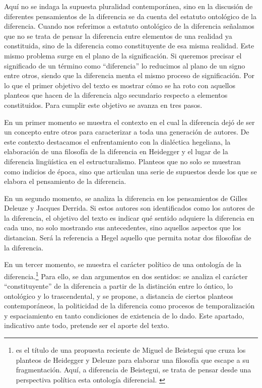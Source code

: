 Aquí no se indaga la supuesta pluralidad contemporánea, sino en la discusión de diferentes pensamientos de la diferencia se da cuenta del estatuto ontológico de la diferencia. Cuando nos referimos a estatuto ontológico de la diferencia señalamos que no se trata de pensar la diferencia entre elementos de una realidad ya constituida, sino de la diferencia como constituyente de esa misma realidad. Este mismo problema surge en el plano de la significación. Si queremos precisar el significado de un término como \enquote{diferencia} lo reducimos al plano de un signo entre otros, siendo que la diferencia menta el mismo proceso de significación. Por lo que el primer objetivo del texto es mostrar cómo se ha roto con aquellos planteos que hacen de la diferencia algo secundario respecto a elementos constituidos. Para cumplir este objetivo se avanza en tres pasos.

En un primer momento se muestra el contexto en el cual la diferencia dejó de ser un concepto entre otros para caracterizar a toda una generación de autores. De este contexto destacamos el enfrentamiento con la dialéctica hegeliana, la elaboración de una filosofía de la diferencia en Heidegger y el lugar de la diferencia lingüística en el estructuralismo. Planteos que no solo se muestran como indicios de época, sino que articulan una serie de supuestos desde los que se elabora el pensamiento de la diferencia.

En un segundo momento, se analiza la diferencia en los pensamientos de Gilles Deleuze y Jacques Derrida. Si estos autores son identificados como los autores de la diferencia, el objetivo del texto es indicar qué sentido adquiere la diferencia en cada uno, no solo mostrando sus antecedentes, sino aquellos aspectos que los distancian. Será la referencia a Hegel aquello que permita notar dos filosofías de la diferencia.

En un tercer momento, se muestra el carácter político de una ontología de la diferencia.\footnote{\emph{\autocite{@6960-BEISTEGUI2004}} es el título de una propuesta reciente de Miguel de Beistegui que cruza los planteos de Heidegger y Deleuze para elaborar  una filosofía que escape a su fragmentación. Aquí, a diferencia de \linebreak  Beistegui, se trata de pensar desde una perspectiva política esta ontología diferencial. \cite[Véase][25]{@6960-BEISTEGUI2004}} Para ello, se dan argumentos en dos sentidos: se analiza el carácter \enquote{constituyente} de la diferencia a partir de la distinción entre lo óntico, lo ontológico y lo trascendental, y se propone, a distancia de ciertos planteos contemporáneos, la politicidad de la diferencia como procesos de temporalización y espaciamiento en tanto condiciones de existencia de lo dado. Este apartado, indicativo ante todo, pretende ser el aporte del texto.

